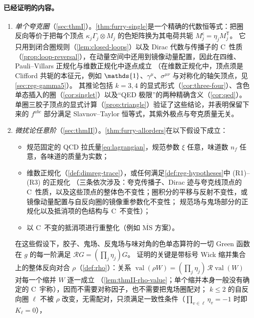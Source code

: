 \documentclass[UTF8,a4paper,11pt,fontset=fandol]{ctexart}
\let\amsmathbb\mathbb
\renewcommand{\mathbb}[1]{\ifx1#1\mathds{1}\else\amsmathbb{#1}\fi}
\theoremstyle{cplain}
\theoremstyle{cdefinition}
\theoremstyle{cremark}
\numberwithin{equation}{section}
\newcommand{\tp}{\mathsf{T}}                         %
\newcommand{\Rop}{\mathcal{R}}                       %
\begin{document}
\paragraph{已经证明的内容。}
\begin{enumerate}[label=(\arabic*),leftmargin=2em,itemsep=2pt,topsep=3pt,beginpenalty=10000]
\item \emph{单个夸克圈}（\cref{sec:thmI}）。\cref{thm:furry-single}是一个精确的代数恒等式：把圈反向等价于把每个顶点 $\kappa_j\Gamma_j\otimes M_j$ 的色矩阵换为其电荷共轭 $M_j^{\mathsf c}=\eta_jM_j^{\tp}$。
它只用到闭合圈规则（\cref{lem:closed-loops}）以及 Dirac 代数与传播子的 C~性质（\cref{prop:loop-reversal}），在动量空间中还用到镜像动量配置，因此在四维、Pauli--Villars 正规化与维数正规化中逐点成立
（在维数正规化中，顶点须是 Clifford 共轭的本征元，例如 $\mathbb 1$、$\gamma^\mu$、$\sigma^{\mu\nu}$ 与对称化的轴矢顶点，见\cref{sec:reg-gamma5}）。
其推论包括 $k=3,4$ 的显式形式（\cref{cor:three-four}）、含色单态插入的圈（\cref{cor:singlet}）以及“QED 极限”的两种精确含义（\cref{cor:qed}）。
单圈三胶子顶点的显式计算（\cref{prop:triangle}）验证了这些结论，并表明保留下来的 $f^{abc}$ 部分满足 Slavnov--Taylor 恒等式，其紫外极点与夸克质量无关。
\item \emph{微扰论任意阶}（\cref{sec:thmII}）。\cref{thm:furry-allorders}在以下假设下成立：
\begin{itemize}[leftmargin=2.6em,itemsep=0pt,topsep=2pt]
\item[(H1)] 规范固定的 QCD 拉氏量\cref{eq:lagrangian}，规范参数 $\xi$ 任意，味道数 $n_f$ 任意，各味道的质量为实数；
\item[(H2)] 维数正规化（\cref{def:dimreg-trace}），或任何满足\cref{def:reg-hypotheses}中 (R1)--(R3) 的正规化
（三条依次涉及：夸克传播子、Dirac 迹与夸克线顶点的 C~性质，以及这些顶点的整体色不变性；圈积分的平移与反射不变性，或镜像动量配置与自反向圈的镜像重参数化不变性；
规范场与鬼场部分的正规化以及抵消项的色结构与 C~不变性）；
\item[(H3)] 以 C~不变的抵消项进行重整化（例如 $\overline{\mathrm{MS}}$ 方案）。
\end{itemize}
在这些假设下，胶子、鬼场、反鬼场与味对角的色单态算符的一切 Green 函数在 $g$ 的每一阶满足 $\Rop G=(\prod_j\eta_j)G$。
证明的关键是带标号 Wick 缩并集合上的整体反向对合 $\rho$（\cref{def:rho}）：关系 $\operatorname{val}(\rho W)=(\prod_j\eta_j)\,\Rop\operatorname{val}(W)$ 对每一个缩并 $W$ 逐一成立
（\cref{lem:thmII-rho-value}；单个缩并本身一般没有确定的 C~宇称），因而不需要对称因子，也不需要把鬼场圈配对；
$k\le2$ 的自反向圈 $\ell$ 不被 $\rho$ 改变，无需配对，只须满足一致性条件（$\prod_{v\in\ell}\eta_v=-1$ 时即 $K_\ell=0$），

\end{enumerate}
\end{document}
